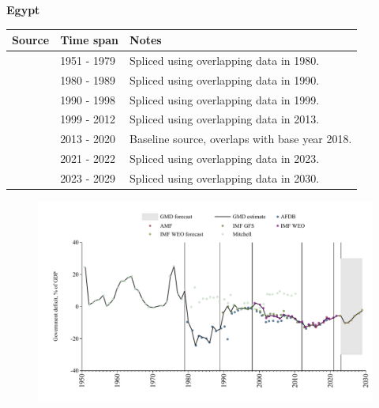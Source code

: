\documentclass[12pt,a4paper,landscape]{article}
\begin{document}
\begin{adjustbox}{max totalsize={\paperwidth}{\paperheight},center}
\begin{minipage}[t][\textheight][t]{\textwidth}
\vspace*{0.5cm}
{}
\begin{center}
{\Large\bfseries Egypt}
\end{center}
\vspace{0.5cm}
\begin{table}[H]
\centering
\small
\begin{tabular}{|l|l|l|}
\hline
\textbf{Source} & \textbf{Time span} & \textbf{Notes} \\
\hline
\rowcolor{white}\cite{Mitchell}& 1951 - 1979 &Spliced using overlapping data in 1980.\\
\rowcolor{lightgray}\cite{AFDB}& 1980 - 1989 &Spliced using overlapping data in 1990.\\
\rowcolor{white}\cite{IMF_GFS}& 1990 - 1998 &Spliced using overlapping data in 1999.\\
\rowcolor{lightgray}\cite{IMF_WEO}& 1999 - 2012 &Spliced using overlapping data in 2013.\\
\rowcolor{white}\cite{AMF}& 2013 - 2020 &Baseline source, overlaps with base year 2018.\\
\rowcolor{lightgray}\cite{IMF_WEO}& 2021 - 2022 &Spliced using overlapping data in 2023.\\
\rowcolor{white}\cite{IMF_WEO_forecast}& 2023 - 2029 &Spliced using overlapping data in 2030.\\
\hline
\end{tabular}
\end{table}
\begin{figure}[H]
\centering
\includegraphics[width=\textwidth,height=0.6\textheight,keepaspectratio]{graphs/EGY_govdef_GDP.pdf}
\end{figure}
\end{minipage}
\end{adjustbox}
\end{document}
